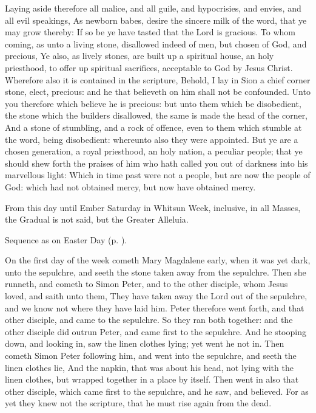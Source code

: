  Laying aside therefore all malice, and all guile, and hypocrisies, and envies, and all evil speakings, As newborn babes, desire the sincere milk of the word, that ye may grow thereby: If so be ye have tasted that the Lord is gracious. To whom coming, as unto a living stone, disallowed indeed of men, but chosen of God, and precious, Ye also, as lively stones, are built up a spiritual house, an holy priesthood, to offer up spiritual sacrifices, acceptable to God by Jesus Christ. Wherefore also it is contained in the scripture, Behold, I lay in Sion a chief corner stone, elect, precious: and he that believeth on him shall not be confounded. Unto you therefore which believe he is precious: but unto them which be disobedient, the stone which the builders disallowed, the same is made the head of the corner, And a stone of stumbling, and a rock of offence, even to them which stumble at the word, being disobedient: whereunto also they were appointed. But ye are a chosen generation, a royal priesthood, an holy nation, a peculiar people; that ye should shew forth the praises of him who hath called you out of darkness into his marvellous light: Which in time past were not a people, but are now the people of God: which had not obtained mercy, but now have obtained mercy.

\begin{rubric}
	From this day until Ember Saturday in Whitsun Week, inclusive, in all Masses, the Gradual is not said, but the Greater Alleluia. 
\end{rubric}


\begin{rubric}
    Sequence as on Easter Day (p. \pageref{PaschalSequence}).
\end{rubric}

 On the first day of the week cometh Mary Magdalene early, when it was yet dark, unto the sepulchre, and seeth the stone taken away from the sepulchre. Then she runneth, and cometh to Simon Peter, and to the other disciple, whom Jesus loved, and saith unto them, They have taken away the Lord out of the sepulchre, and we know not where they have laid him. Peter therefore went forth, and that other disciple, and came to the sepulchre. So they ran both together: and the other disciple did outrun Peter, and came first to the sepulchre. And he stooping down, and looking in, saw the linen clothes lying; yet went he not in. Then cometh Simon Peter following him, and went into the sepulchre, and seeth the linen clothes lie, And the napkin, that was about his head, not lying with the linen clothes, but wrapped together in a place by itself. Then went in also that other disciple, which came first to the sepulchre, and he saw, and believed. For as yet they knew not the scripture, that he must rise again from the dead.

